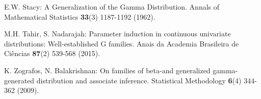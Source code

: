 \documentclass[12pt,a4paper]{article} %
\begin{document}
\begin{description}
\item
E.W. Stacy: A Generalization of the Gamma Distribution. Annals of Mathematical Statistics {\bf 33}(3) 1187-1192 (1962).

\item
M.H. Tahir, S. Nadarajah:
Parameter induction in continuous univariate distributions: Well-established G families.
Anais da Academia Brasileira de Ci\^{e}ncias {\bf 87}(2) 539-568 (2015).

\item
K. Zografos, N. Balakrishnan:
On families of beta-and generalized gamma-generated distribution and
associate inference.  Statistical Methodology {\bf 6}(4) 344-362 (2009).

\end{description}
\end{document}
